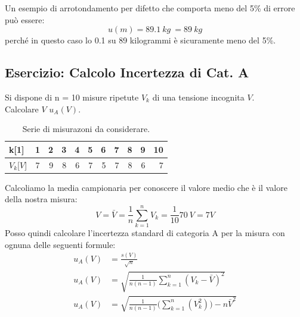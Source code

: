 \documentclass[a4paper,11pt]{report}
\begin{document}
Un esempio di arrotondamento per difetto che comporta meno del 5\% di errore può essere:
$$
  u(m) = 89.1\ kg\ = 89\ kg
$$
perché in questo caso lo 0.1 su 89 kilogrammi è sicuramente meno del 5\%.
\subsection{Esercizio: Calcolo Incertezza di Cat. A}
Si dispone di n = 10 misure ripetute $V_k$ di una tensione incognita $V$.\\
Calcolare $V$ $u_A(V)$.
\begin{table}[H]
  \caption{Serie di misurazoni da considerare.}
  \label{tab:esIncertezza}

  \begin{center}
    \begin{tabular}{|l|c|r|r|r|r|r|r|r|r|r|}
    \hline
       k[1]       & 1& 2& 3& 4& 5& 6& 7& 8& 9& 10 \\
    \hline
       $V_k$[$V$] & 7& 9& 8& 6& 7& 5& 7& 8& 6& 7 \\
    \hline
    \end{tabular}
  \end{center}
\end{table}
Calcoliamo la media campionaria per conoscere il valore medio che è il valore della nostra misura:
$$
  V = \bar{V} = \frac{1}{n}\sum^n_{k=1}V_k = \frac{1}{10}70\ V = 7 V
$$
Posso quindi calcolare l'incertezza standard di categoria A per la misura con ognuna delle seguenti formule:
\begin{align}
  u_A(V)& = \frac{s(V)}{\sqrt{n}} \label{incA:1}\\
  u_A(V)& = \sqrt{\frac{1}{n(n-1)}\sum^n_{k=1}(V_k-\bar{V})^2} \label{incA:2}\\
  u_A(V)& = \sqrt{\frac{1}{n(n-1)}\Bigg(\sum^n_{k=1}(V_k^2)\Bigg)-n\bar{V}^2} \label{incA:3}
\end{align}
\end{document}
